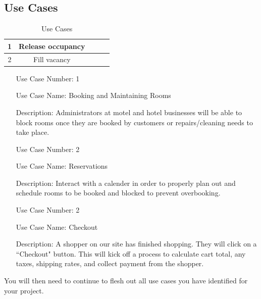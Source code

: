 \documentclass[10pt,conference,onecolumn,compsoc]{IEEEtran}
\begin{document}
\subsection{Use Cases}

\begin{table}
\centering
\begin{tabular}{|c|c|c|c|c|}
\hline
1 & Release occupancy\\
\hline \hline
2 & Fill vacancy\\
\hline

\end{tabular}
\caption{Use Cases}
\label{tab:useCaseIndex}
\end{table}


\begin{itemize}
\item[Use Case Number:] 1
\item[Use Case Name:] Booking and Maintaining Rooms
\item[Description:] Administrators at motel and hotel businesses will be able to block rooms once they are booked by customers or repairs/cleaning needs to take place.

\item[Use Case Number:] 2
\item[Use Case Name:] Reservations
\item[Description:] Interact with a calender in order to properly plan out and schedule rooms to be booked and blocked to prevent overbooking.
\end{itemize}

\begin{itemize}
\item[Use Case Number:] 2
\item[Use Case Name:] Checkout
\item[Description:] A shopper on our site has finished shopping.  They will click on a ``Checkout" button.  This will kick off a process to calculate cart total, any taxes, shipping rates, and collect payment from the shopper.

\end{itemize}

You will then need to continue to flesh out all use cases you have identified for your project.
\end{document}

